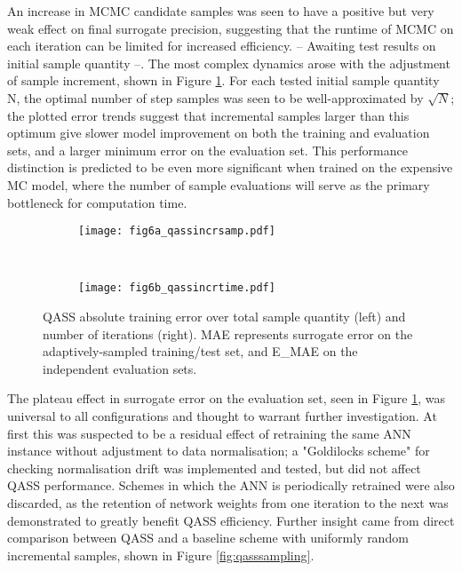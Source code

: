 An increase in MCMC candidate samples was seen to have a positive but very weak effect on final surrogate precision, suggesting that the runtime of MCMC on each iteration can be limited for increased efficiency. -- Awaiting test results on initial sample quantity --. The most complex dynamics arose with the adjustment of sample increment, shown in Figure \ref{fig:qassincr}. For each tested initial sample quantity N, the optimal number of step samples was seen to be well-approximated by $\sqrt{N}$; the plotted error trends suggest that incremental samples larger than this optimum give slower model improvement on both the training and evaluation sets, and a larger minimum error on the evaluation set. This performance distinction is predicted to be even more significant when trained on the expensive MC model, where the number of sample evaluations will serve as the primary bottleneck for computation time.
\begin{figure}[h!]
    \centering
    \begin{subfigure}[t]{0.5\textwidth}
        \centering
        \texttt{[image: fig6a\_qassincrsamp.pdf]}
    \end{subfigure}%
    ~ 
    \begin{subfigure}[t]{0.5\textwidth}
        \centering
        \texttt{[image: fig6b\_qassincrtime.pdf]}
    \end{subfigure}
    \caption{QASS absolute training error over total sample quantity (left) and number of iterations (right). MAE represents surrogate error on the adaptively-sampled training/test set, and E\_MAE on the independent evaluation sets.}
    \label{fig:qassincr}
\end{figure}

The plateau effect in surrogate error on the evaluation set, seen in Figure \ref{fig:qassincr}, was universal to all configurations and thought to warrant further investigation. At first this was suspected to be a residual effect of retraining the same ANN instance without adjustment to data normalisation; a "Goldilocks scheme" for checking normalisation drift was implemented and tested, but did not affect QASS performance. Schemes in which the ANN is periodically retrained were also discarded, as the retention of network weights from one iteration to the next was demonstrated to greatly benefit QASS efficiency. Further insight came from direct comparison between QASS and a baseline scheme with uniformly random incremental samples, shown in Figure \ref{fig:qasssampling}.

